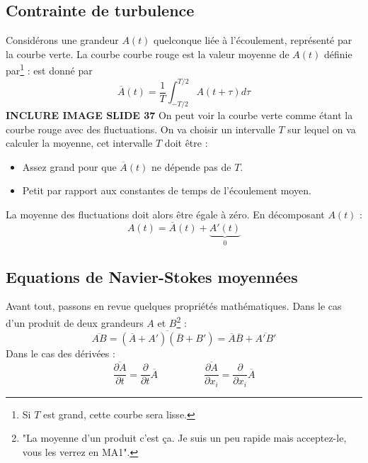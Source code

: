 	\subsection{Contrainte de turbulence}
	Considérons une grandeur $A(t)$ quelconque liée à l'écoulement, représenté par la courbe verte. 
	La courbe courbe rouge est la valeur moyenne de $A(t)$ définie par\footnote{Si $T$ est grand, 
	cette courbe sera lisse.} : 
	est donné par 
	\begin{equation}
	\overline{A}(t) = \frac{1}{T}\int_{-T/2}^{T/2} A(t+\tau)d\tau
	\end{equation}
	\textbf{INCLURE IMAGE SLIDE 37}
	On peut voir la courbe verte comme étant la courbe rouge avec des fluctuations. On va choisir 
	un intervalle $T$ sur lequel on va calculer la moyenne, cet intervalle $T$ doit être :
	\begin{itemize}
	\item Assez grand pour que $\overline{A}(t)$ ne dépende pas de $T$.
	\item Petit par rapport aux constantes de temps de l'écoulement moyen.
	\end{itemize}
	La moyenne des fluctuations doit alors être égale à zéro. En décomposant $A(t)$ :
	\begin{equation}
	A(t) = \overline{A}(t) + \underbrace{A'(t)}_{0}
	\end{equation}
	
	
	
	\subsection{Equations de Navier-Stokes moyennées}
	Avant tout, passons en revue quelques propriétés mathématiques. Dans le cas d'un produit de deux 
	grandeurs $A$ et $B$\footnote{"La moyenne d'un produit c'est ça. Je suis un peu rapide mais 
	acceptez-le, vous les verrez en MA1".} :
	\begin{equation}
	\overline{AB} = \overline{(\overline{A}+A')(\overline{B}+B')} = \overline{A}\overline{B} + 
	\overline{A'B'}
	\end{equation}
	Dans le cas des dérivées :
	\begin{equation}
	\frac{\overline{\partial A}}{\partial t} = \frac{\partial}{\partial t}\overline{A}\ \ \ \ \ \ 
	\ \ \ \ \ \ \ \ \ \ \ \ \ \ \ \frac{\overline{\partial A}}{\partial x_i} = \frac{\partial}{
	\partial x_i}\overline{A}
	\end{equation}
	
